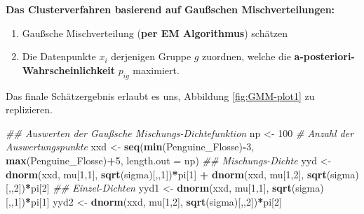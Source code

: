 \documentclass[
  ngerman,
]{book}
\newenvironment{Shaded}{\begin{snugshade}}{\end{snugshade}}
\newcommand{\CommentTok}[1]{\textcolor[rgb]{0.56,0.35,0.01}{\textit{#1}}}
\newcommand{\DataTypeTok}[1]{\textcolor[rgb]{0.13,0.29,0.53}{#1}}
\newcommand{\DecValTok}[1]{\textcolor[rgb]{0.00,0.00,0.81}{#1}}
\newcommand{\KeywordTok}[1]{\textcolor[rgb]{0.13,0.29,0.53}{\textbf{#1}}}
\newcommand{\NormalTok}[1]{#1}
\newcommand{\OperatorTok}[1]{\textcolor[rgb]{0.81,0.36,0.00}{\textbf{#1}}}
\newcommand{\StringTok}[1]{\textcolor[rgb]{0.31,0.60,0.02}{#1}}
\providecommand{\tightlist}{%
  \setlength{\itemsep}{0pt}\setlength{\parskip}{0pt}}
\begin{document}
\textbf{Das Clusterverfahren basierend auf Gaußschen Mischverteilungen:}

\begin{enumerate}
\def\labelenumi{\arabic{enumi}.}
\tightlist
\item
  Gaußsche Mischverteilung (\textbf{per EM Algorithmus}) schätzen
\item
  Die Datenpunkte \(x_i\) derjenigen Gruppe \(g\) zuordnen, welche die \textbf{a-posteriori-Wahrscheinlichkeit} \(p_{ig}\) maximiert.
\end{enumerate}

Das finale Schätzergebnis erlaubt es uns, Abbildung \ref{fig:GMM-plot1} zu replizieren.

\begin{Shaded}
\begin{Highlighting}[]
\CommentTok{## Auswerten der Gaußsche Mischungs-Dichtefunktion}
\NormalTok{np      <-}\StringTok{ }\DecValTok{100} \CommentTok{# Anzahl der Auswertungspunkte}
\NormalTok{xxd     <-}\StringTok{ }\KeywordTok{seq}\NormalTok{(}\KeywordTok{min}\NormalTok{(Penguine_Flosse)}\OperatorTok{-}\DecValTok{3}\NormalTok{, }\KeywordTok{max}\NormalTok{(Penguine_Flosse)}\OperatorTok{+}\DecValTok{5}\NormalTok{, }\DataTypeTok{length.out =}\NormalTok{ np)}
\CommentTok{## Mischungs-Dichte}
\NormalTok{yyd     <-}\StringTok{ }\KeywordTok{dnorm}\NormalTok{(xxd, mu[}\DecValTok{1}\NormalTok{,}\DecValTok{1}\NormalTok{], }\KeywordTok{sqrt}\NormalTok{(sigma)[,,}\DecValTok{1}\NormalTok{])}\OperatorTok{*}\NormalTok{pi[}\DecValTok{1}\NormalTok{] }\OperatorTok{+}
\StringTok{           }\KeywordTok{dnorm}\NormalTok{(xxd, mu[}\DecValTok{1}\NormalTok{,}\DecValTok{2}\NormalTok{], }\KeywordTok{sqrt}\NormalTok{(sigma)[,,}\DecValTok{2}\NormalTok{])}\OperatorTok{*}\NormalTok{pi[}\DecValTok{2}\NormalTok{]}
\CommentTok{## Einzel-Dichten}
\NormalTok{yyd1    <-}\StringTok{ }\KeywordTok{dnorm}\NormalTok{(xxd, mu[}\DecValTok{1}\NormalTok{,}\DecValTok{1}\NormalTok{], }\KeywordTok{sqrt}\NormalTok{(sigma)[,,}\DecValTok{1}\NormalTok{])}\OperatorTok{*}\NormalTok{pi[}\DecValTok{1}\NormalTok{]}
\NormalTok{yyd2    <-}\StringTok{ }\KeywordTok{dnorm}\NormalTok{(xxd, mu[}\DecValTok{1}\NormalTok{,}\DecValTok{2}\NormalTok{], }\KeywordTok{sqrt}\NormalTok{(sigma)[,,}\DecValTok{2}\NormalTok{])}\OperatorTok{*}\NormalTok{pi[}\DecValTok{2}\NormalTok{]}


\end{Highlighting}
\end{Shaded}
\end{document}
